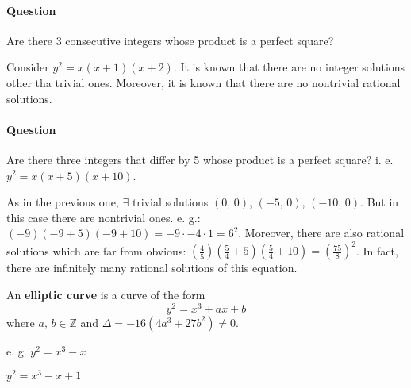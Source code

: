 \paragraph{Question} Are there 3 consecutive integers whose product
is a perfect square?

Consider $y^2=x\left(x+1\right)\left(x+2\right)$. It is known that
there are no integer solutions other tha trivial ones.
Moreover, it is known that there are no nontrivial rational solutions.

\paragraph{Question} Are there three integers that differ by 5 whose
product is a perfect square? i. e. $y^2=x\left(x+5\right)\left(x+10\right)$.

As in the previous one, $\exists$ trivial solutions $\left( 0,\,0 \right)$,
$\left( -5,\,0 \right)$, $\left( -10,\,0 \right)$. But in this case there are
nontrivial ones. e. g.:
$\left(-9\right)\left(-9+5\right)\left(-9+10\right)=-9\cdot-4\cdot 1=6^2$.
Moreover, there are also rational solutions which are far from obvious:
$\left(\frac{4}{5}\right)\left(\frac{5}{4}+5\right)\left(\frac{5}{4}+10\right)=\left(\frac{75}{8}\right)^2$.
In fact, there are infinitely many rational solutions of this equation.

\begin{definition}
    An \textbf{elliptic curve} is a curve of the form
    \[y^2=x^3+ax+b\]
    where $a,\,b\in\mathbb{Z}$ and $\Delta=-16\left(4a^3+27b^2\right)\neq 0$.
\end{definition}

e. g. $y^2=x^3-x$

\begin{center}
\end{center}

$y^2=x^3-x+1$

\begin{center}
\end{center}